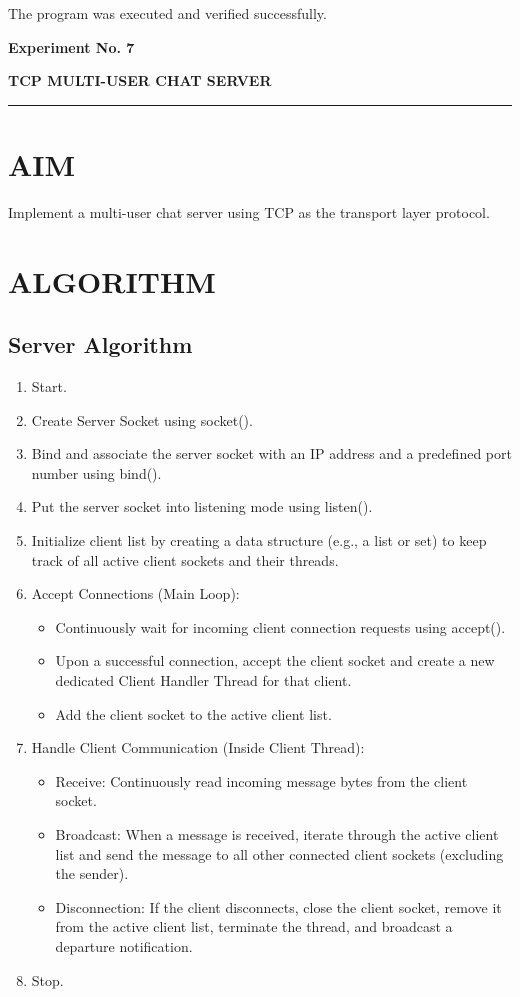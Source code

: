 \documentclass[12pt,a4paper]{article}
\newcommand{\experiment}[2]{
	\newpage
	
	\begin{center}
		\noindent
		\begin{minipage}{\textwidth}
			\centering
			{\textbf{\Large Experiment No. #1}}
			
			\vspace{1cm}
			
			\textbf{\Large #2}
		\end{minipage}
		
		\vspace{0.3cm}
		\noindent\rule{\textwidth}{0.6pt}
	\end{center}
}
\begin{document}
	The program was executed and verified successfully.
	
		
	
	\experiment{7}{TCP MULTI-USER CHAT SERVER}
	
	\section*{AIM}
	
	Implement a multi-user chat server using TCP as the transport layer protocol.
	
	\section*{ALGORITHM}

	\subsection*{Server Algorithm}
	\begin{enumerate}
		\item Start.
		\item Create Server Socket using socket().
		\item Bind and associate the server socket with an IP address and a predefined port number using bind().
		\item Put the server socket into listening mode using listen().
		\item Initialize client list by creating a data structure (e.g., a list or set) to keep track of all active client sockets and their threads.
		\item Accept Connections (Main Loop):
		\begin{itemize}
			\item Continuously wait for incoming client connection requests using accept().
			\item Upon a successful connection, accept the client socket and create a new dedicated Client Handler Thread for that client.
			\item Add the client socket to the active client list.
		\end{itemize}
		\item Handle Client Communication (Inside Client Thread):
		\begin{itemize}
			\item Receive: Continuously read incoming message bytes from the client socket.
			\item Broadcast: When a message is received, iterate through the active client list and send the message to all other connected client sockets (excluding the sender).
			\item Disconnection: If the client disconnects, close the client socket, remove it from the active client list, terminate the thread, and broadcast a departure notification.
		\end{itemize}
		\item Stop.
	\end{enumerate}
\end{document}
